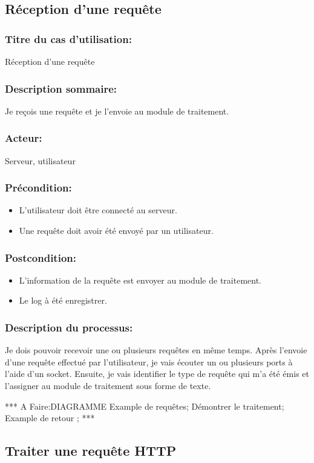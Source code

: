 \documentclass{scrreprt}
\begin{document}
\subsection{Réception d'une requête}
\subsubsection{Titre du cas d'utilisation:} Réception d'une requête
\subsubsection{Description sommaire:} Je reçois une requête et je l'envoie au module de traitement.
\subsubsection{Acteur:} Serveur, utilisateur
\subsubsection{Précondition:}
\begin{itemize}
	\item L'utilisateur doit être connecté au serveur.
    \item Une requête doit avoir été envoyé par un utilisateur.
\end{itemize} 
\subsubsection{Postcondition:}
\begin{itemize}
    \item  L'information de la requête est envoyer au module de traitement.
    \item  Le log à été enregistrer.
\end{itemize} 
\subsubsection{Description du processus:}
Je dois pouvoir recevoir une ou plusieurs requêtes en même temps. Après l'envoie d'une requête effectué par l'utilisateur, je vais écouter un ou plusieurs ports à l'aide d'un socket. Ensuite, je vais identifier le type de requête qui m'a été émis et l'assigner au module de traitement sous forme de texte.


*** A Faire:DIAGRAMME
Example de requêtes;
Démontrer le traitement;
Example de retour ;
***

\subsection{Traiter une requête HTTP}
\end{document}
